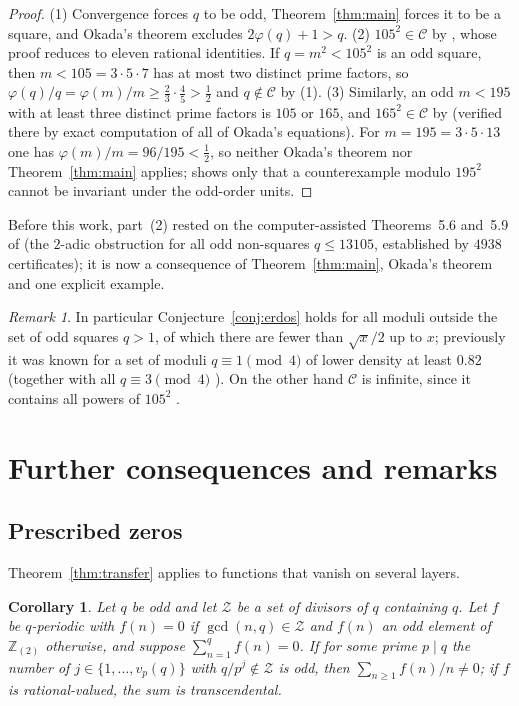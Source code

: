 \documentclass[11pt]{amsart}
\newtheorem{corollary}[theorem]{Corollary}
\theoremstyle{definition}
\theoremstyle{remark}
\newtheorem{remark}[theorem]{Remark}
\newcommand{\Zt}{\mathbb Z_{(2)}}
\numberwithin{equation}{section}
\begin{document}
\begin{proof}
(1) Convergence forces $q$ to be odd, Theorem~\ref{thm:main} forces it to be a square, and Okada's theorem \cite{Oka82} excludes $2\varphi(q)+1>q$.
(2) $105^2\in\mathcal C$ by \cite[Thm.~3.1]{Kei26}, whose proof reduces to eleven rational identities.
If $q=m^2<105^2$ is an odd square, then $m<105=3\cdot5\cdot7$ has at most two distinct prime factors, so $\varphi(q)/q=\varphi(m)/m\ge\frac23\cdot\frac45>\frac12$ and $q\notin\mathcal C$ by (1).
(3) Similarly, an odd $m<195$ with at least three distinct prime factors is $105$ or $165$, and $165^2\in\mathcal C$ by \cite[Thm.~3.3]{Kei26} (verified there by exact computation of all of Okada's equations).
For $m=195=3\cdot5\cdot13$ one has $\varphi(m)/m=96/195<\frac12$, so neither Okada's theorem nor Theorem~\ref{thm:main} applies; \cite[Sect.~6]{Kei26} shows only that a counterexample modulo $195^2$ cannot be invariant under the odd-order units.
\end{proof}

Before this work, part~(2) rested on the computer-assisted Theorems~5.6 and~5.9 of \cite{Kei26} (the $2$-adic obstruction for all odd non-squares $q\le13105$, established by $4938$ certificates); it is now a consequence of Theorem~\ref{thm:main}, Okada's theorem and one explicit example.

\begin{remark}
In particular Conjecture~\ref{conj:erdos} holds for all moduli outside the set of odd squares $q>1$, of which there are fewer than $\sqrt x/2$ up to $x$; previously it was known for a set of moduli $q\equiv1\pmod4$ of lower density at least $0.82$ \cite{CM15} (together with all $q\equiv3\pmod 4$ \cite{MS10}).
On the other hand $\mathcal C$ is infinite, since it contains all powers of $105^2$ \cite[Thm.~3.6]{Kei26}.
\end{remark}
\section{Further consequences and remarks}\label{sec:further}

\subsection{Prescribed zeros}
Theorem~\ref{thm:transfer} applies to functions that vanish on several layers.

\begin{corollary}\label{cor:zeros}
Let $q$ be odd and let $\mathcal Z$ be a set of divisors of $q$ containing $q$.
Let $f$ be $q$-periodic with $f(n)=0$ if $\gcd(n,q)\in\mathcal Z$ and $f(n)$ an odd element of $\Zt$ otherwise, and suppose $\sum_{n=1}^qf(n)=0$.
If for some prime $p\mid q$ the number of $j\in\{1,\dots,v_p(q)\}$ with $q/p^j\notin\mathcal Z$ is odd, then $\sum_{n\ge1}f(n)/n\neq0$; if $f$ is rational-valued, the sum is transcendental.
\end{corollary}
\end{document}
